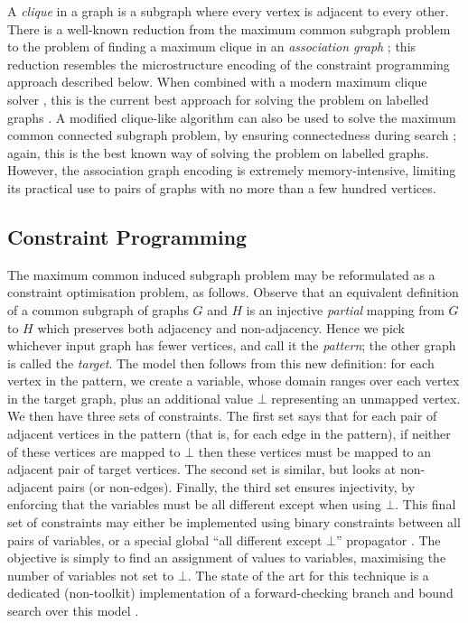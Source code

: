 \documentclass{llncs}
\begin{document}
A \emph{clique} in a graph is a subgraph where every vertex is adjacent to every other. There is a
well-known reduction from the maximum common subgraph problem to the problem of finding a maximum
clique in an \emph{association graph}
\cite{o:Levi73,DBLP:journals/jcamd/RaymondW02a,DBLP:conf/cp/McCreeshNPS16}; this reduction
resembles the microstructure encoding \cite{DBLP:conf/aaai/Jegou93a} of the constraint programming
approach described below. When combined with a modern maximum clique solver
\cite{DBLP:journals/ol/SegundoMRH13}, this is the current best approach for solving the problem on
labelled graphs \cite{DBLP:conf/cp/McCreeshNPS16}. A modified clique-like algorithm can also be
used to solve the maximum common connected subgraph problem, by ensuring connectedness during search
\cite{DBLP:conf/cp/McCreeshNPS16}; again, this is the best known way of solving the problem on
labelled graphs. However, the association graph encoding is extremely memory-intensive, limiting its
practical use to pairs of graphs with no more than a few hundred vertices.

\subsection{Constraint Programming}

The maximum common induced subgraph problem may be reformulated as a constraint optimisation
problem, as follows.  Observe that an equivalent definition of a common subgraph of graphs $G$ and
$H$ is an injective \emph{partial} mapping from $G$ to $H$ which preserves both adjacency and
non-adjacency.  Hence we pick whichever input graph has fewer vertices, and call it the
\emph{pattern}; the other graph is called the \emph{target}. The model then follows from this new
definition: for each vertex in the pattern, we create a variable, whose domain ranges over each
vertex in the target graph, plus an additional value $\bot$ representing an unmapped vertex. We then
have three sets of constraints.  The first set says that for each pair of adjacent vertices in the
pattern (that is, for each edge in the pattern), if neither of these vertices are mapped to $\bot$
then these vertices must be mapped to an adjacent pair of target vertices. The second set is
similar, but looks at non-adjacent pairs (or non-edges).  Finally, the third set ensures
injectivity, by enforcing that the variables must be all different except when using $\bot$. This
final set of constraints may either be implemented using binary constraints between all pairs of
variables, or a special global ``all different except $\bot$'' propagator
\cite{DBLP:conf/cp/PetitRB01}. The objective is simply to find an assignment of values to
variables, maximising the number of variables not set to $\bot$. The state of the art for this
technique is a dedicated (non-toolkit) implementation of a forward-checking branch and bound search
over this model \cite{DBLP:conf/cp/NdiayeS11,DBLP:conf/cp/McCreeshNPS16}.
\end{document}
